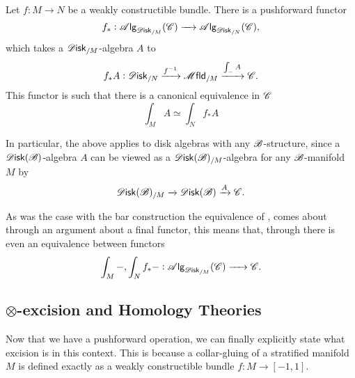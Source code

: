 \documentclass[../text]{subfiles}
\begin{document}
\begin{theorem}\label{thm:fh_pushforward}
    Let $f: M \xrightarrow{} N$ be a weakly constructible bundle. There is a pushforward functor
    \begin{equation}
        f_*: \alg{\disk_{/M}}(\catC) \xrightarrow{\quad} \alg{\disk_{/N}}(\catC),
    \end{equation}
    which takes a $\disk_{/M}$-algebra $A$ to
    \begin{equation}
        f_*A: \disk_{/N} \xrightarrow{f^{-1}} \mfld_{/M} \xrightarrow{\int_{-} A} \catC.
    \end{equation}
    This functor is such that there is a canonical equivalence in $\mathscr{C}$
    \begin{equation}
        \int_{M} A \simeq \int_{N} f_* A
    \end{equation}
\end{theorem}


\begin{remark}
    In particular, the above applies to disk algebras with any $\mathscr{B}$-structure, since a $\disk(\bstr)$-algebra $A$ can be viewed as a $\disk(\bstr)_{/M}$-algebra for any $\mathscr{B}$-manifold $M$ by
    \begin{equation}
        \disk(\bstr)_{/M} \xrightarrow{} \disk(\bstr) \xrightarrow{A} \catC.
    \end{equation}
\end{remark}

\begin{remark}\label{rem:fh_pushforward_functorial}
    As was the case with the bar construction the equivalence of , comes about through an argument about a final functor, this means that, through  there is even an equivalence between functors
    \begin{equation}
        \int_M -, \int_N f_* - : \alg{\disk_{/M}} (\catC) \xrightarrow{\ \ \ \ } \catC.
    \end{equation}
\end{remark}




\subsection{\texorpdfstring{$\otimes$}{tensor}-excision and Homology Theories}

Now that we have a pushforward operation, we can finally explicitly state what excision is in this context. This is because a collar-gluing of a stratified manifold $M$ is defined exactly as a weakly constructible bundle $f: M \xrightarrow{} [-1,1]$.
\end{document}
